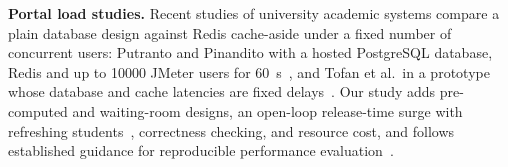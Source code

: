 \textbf{Portal load studies.} Recent studies of university academic systems
compare a plain database design against Redis cache-aside under a fixed number
of concurrent users: Putranto and Pinandito with a hosted PostgreSQL database,
Redis and up to \num{10000} JMeter users for \SI{60}{s}~\cite{putranto2026redis},
and Tofan et al.\ in a
prototype whose database and cache latencies are fixed
delays~\cite{tofan2026cacheaside}. Our study adds
pre-computed and waiting-room designs, an open-loop release-time surge with
refreshing students~\cite{schroeder2006open}, correctness checking, and
resource cost, and follows established guidance for reproducible performance
evaluation~\cite{papadopoulos2019methodological,uta2020bigdata}.
